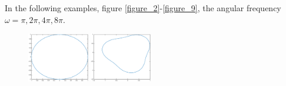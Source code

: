\documentclass[12pt]{iopart}
\begin{document}
In the following examples, figure \ref{figure_2}-\ref{figure_9}, the angular frequency $\omega= \pi,2\pi,4\pi,8\pi$.
\begin{figure}
	\centering
	\includegraphics[width=0.24\textwidth]{./figure_sc_elastic/circle.eps}
	\includegraphics[width=0.24\textwidth]{./figure_sc_elastic/pear.eps}
	\caption{}\label{shape}
\end{figure}
\end{document}
